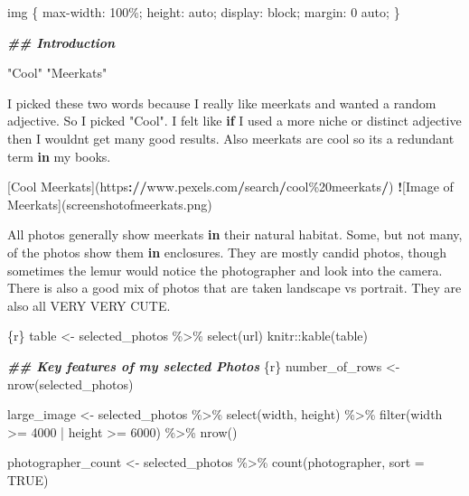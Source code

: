 \documentclass[
]{article}
\newenvironment{Shaded}{\begin{snugshade}}{\end{snugshade}}
\newcommand{\AttributeTok}[1]{\textcolor[rgb]{0.13,0.29,0.53}{#1}}
\newcommand{\ControlFlowTok}[1]{\textcolor[rgb]{0.13,0.29,0.53}{\textbf{#1}}}
\newcommand{\DecValTok}[1]{\textcolor[rgb]{0.00,0.00,0.81}{#1}}
\newcommand{\DocumentationTok}[1]{\textcolor[rgb]{0.56,0.35,0.01}{\textbf{\textit{#1}}}}
\newcommand{\ErrorTok}[1]{\textcolor[rgb]{0.64,0.00,0.00}{\textbf{#1}}}
\newcommand{\NormalTok}[1]{#1}
\newcommand{\SpecialCharTok}[1]{\textcolor[rgb]{0.81,0.36,0.00}{\textbf{#1}}}
\newcommand{\StringTok}[1]{\textcolor[rgb]{0.31,0.60,0.02}{#1}}
\begin{document}
\begin{Shaded}
\begin{Highlighting}[]
\AttributeTok{img \{}
\AttributeTok{  max{-}width: 100\%;}
\AttributeTok{  height: auto;}
\AttributeTok{  display: block;}
\AttributeTok{  margin: 0 auto;}
\AttributeTok{  }
\AttributeTok{\}}

\StringTok{\textasciigrave{}\textasciigrave{}\textasciigrave{}}
\DocumentationTok{\#\# Introduction}

\StringTok{"Cool"} \StringTok{"Meerkats"}

\NormalTok{I picked these two words because I really like meerkats and wanted a random adjective. So I picked }\StringTok{"Cool"}\NormalTok{. I felt like }\ControlFlowTok{if}\NormalTok{ I used a more niche or distinct adjective then I wouldn}\StringTok{\textquotesingle{}t get many good results. Also meerkats are cool so it\textquotesingle{}}\NormalTok{s a redundant term }\ControlFlowTok{in}\NormalTok{ my books.}

\NormalTok{[Cool Meerkats](https}\SpecialCharTok{:}\ErrorTok{//}\NormalTok{www.pexels.com}\SpecialCharTok{/}\NormalTok{search}\SpecialCharTok{/}\NormalTok{cool\%}\DecValTok{20}\NormalTok{meerkats}\SpecialCharTok{/}\NormalTok{) }
\SpecialCharTok{!}\NormalTok{[Image of Meerkats](screenshotofmeerkats.png)}

\NormalTok{All photos generally show meerkats }\ControlFlowTok{in}\NormalTok{ their natural habitat. Some, but not many, of the photos show them }\ControlFlowTok{in}\NormalTok{ enclosures. They are mostly candid photos, though sometimes the lemur would notice the photographer and look into the camera. There is also a good mix of photos that are taken landscape vs portrait. They are also all VERY VERY CUTE.}

\StringTok{\textasciigrave{}\textasciigrave{}\textasciigrave{}}\AttributeTok{\{r\}}
\AttributeTok{table \textless{}{-} selected\_photos \%\textgreater{}\% select(url)}
\AttributeTok{knitr::kable(table) }
\StringTok{\textasciigrave{}\textasciigrave{}\textasciigrave{}}

\DocumentationTok{\#\# Key features of my selected Photos}
\StringTok{\textasciigrave{}\textasciigrave{}\textasciigrave{}}\AttributeTok{\{r\}}
\AttributeTok{number\_of\_rows \textless{}{-} nrow(selected\_photos)}

\AttributeTok{large\_image \textless{}{-} selected\_photos \%\textgreater{}\%}
\AttributeTok{  select(width, height) \%\textgreater{}\%}
\AttributeTok{  filter(width \textgreater{}= 4000 | height \textgreater{}= 6000) \%\textgreater{}\%}
\AttributeTok{  nrow()}

\AttributeTok{photographer\_count \textless{}{-} selected\_photos \%\textgreater{}\%}
\AttributeTok{  count(photographer, sort = TRUE)}


\end{Highlighting}
\end{Shaded}
\end{document}
